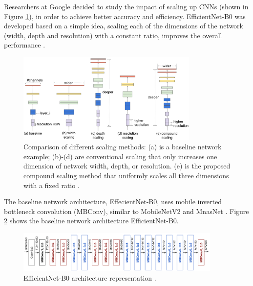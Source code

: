 \par Researchers at Google decided to study the impact of scaling up CNNs (shown in Figure \ref{fig:cenas}), in order to achieve better accuracy and efficiency. EfficientNet-B0 was developed based on a simple idea, scaling each of the dimensions of the network (width, depth and resolution) with a constant ratio, improves the overall performance \cite{tan2019efficientnet}.

\begin{figure}[h]
    \centering
    \captionsetup{justification=centering}
    \includegraphics[width=0.8\textwidth]{Sections/2StateOfTheArt/2_images/efficientNet_scale.png}
    \caption[Comparison of different scaling methods.]{Comparison of different scaling methods:  (a) is a baseline network example; (b)-(d) are conventional scaling that only increases one dimension of network  width, depth, or resolution. (e) is the proposed compound scaling method that uniformly scales all three dimensions with a fixed ratio \cite{tan2019efficientnet}.
    } 
    \label{fig:cenas}

\end{figure}

\newpage

\par The baseline network architecture, EffecientNet-B0, uses mobile inverted bottleneck convolution (MBConv), similar to MobileNetV2 \cite{s2018mobilenetv2} and MnasNet \cite{tan2018mnasnet}. Figure \ref{fig:eff} shows the baseline network architecture EfficientNet-B0.

\begin{figure}[H]
    \centering
    \captionsetup{justification=centering}
    \includegraphics[width=0.9\textwidth]{Sections/2StateOfTheArt/2_images/efficientNet_Arch.png}
    \caption[EfficientNet-B0 architecture.]{EfficientNet-B0 architecture representation \cite{Tan}.} 
    \label{fig:eff}

\end{figure}


